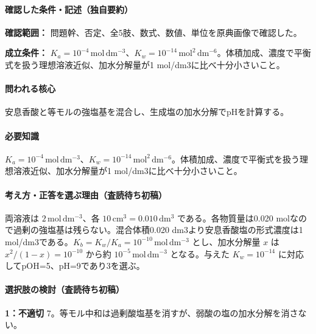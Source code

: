 \paragraph{確認した条件・記述（独自要約）}\mbox{}\par

\noindent\textbf{確認範囲：} 問題幹、否定、全5肢、数式、数値、単位を原典画像で確認した。\par

\noindent\textbf{成立条件：} \(K_a=10^{-4}\,\mathrm{mol\,dm^{-3}}\)、\(K_w=10^{-14}\,\mathrm{mol^2\,dm^{-6}}\)。体積加成、濃度で平衡式を扱う理想溶液近似、加水分解量が1 mol/dm3に比べ十分小さいこと。\par

\paragraph{問われる核心} 安息香酸と等モルの強塩基を混合し、生成塩の加水分解でpHを計算する。

\paragraph{必要知識} \(K_a=10^{-4}\,\mathrm{mol\,dm^{-3}}\)、\(K_w=10^{-14}\,\mathrm{mol^2\,dm^{-6}}\)。体積加成、濃度で平衡式を扱う理想溶液近似、加水分解量が1 mol/dm3に比べ十分小さいこと。

\paragraph{考え方・正答を選ぶ理由（査読待ち初稿）} 両溶液は \(2\,\mathrm{mol\,dm^{-3}}\)、各 \(10\,\mathrm{cm^3}=0.010\,\mathrm{dm^3}\) である。各物質量は0.020 molなので過剰の強塩基は残らない。混合体積0.020 dm3より安息香酸塩の形式濃度は1 mol/dm3である。\(K_b=K_w/K_a=10^{-10}\,\mathrm{mol\,dm^{-3}}\) とし、加水分解量 \(x\) は \(x^2/(1-x)=10^{-10}\) から約 \(10^{-5}\,\mathrm{mol\,dm^{-3}}\) となる。与えた \(K_w=10^{-14}\) に対応してpOH=\allowbreak{}5、pH=\allowbreak{}9であり3を選ぶ。

\paragraph{選択肢の検討（査読待ち初稿）}\mbox{}\par

\noindent\textbf{1：不適切} 7。等モル中和は過剰酸塩基を消すが、弱酸の塩の加水分解を消さない。\par

